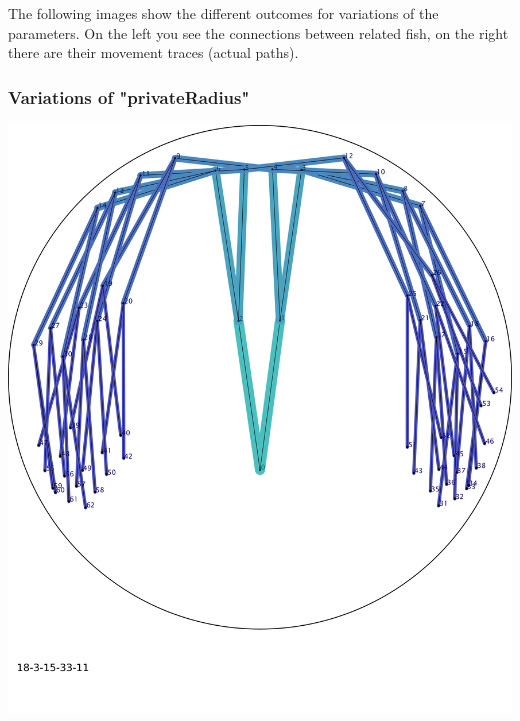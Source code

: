 \documentclass{scrartcl}
\newcommand{\imgSize}{0.46}
\begin{document}
The following images show the different outcomes for variations of the parameters. On the left you see the connections between related fish, on the right there are their movement traces (actual paths).

\subsubsection{Variations of "privateRadius"}

\begin{minipage}[t]{\imgSize\textwidth}
\includegraphics[width=\textwidth]{img_18-3-15-33-11}
\end{minipage}
\hspace{0.5cm}
\end{document}
